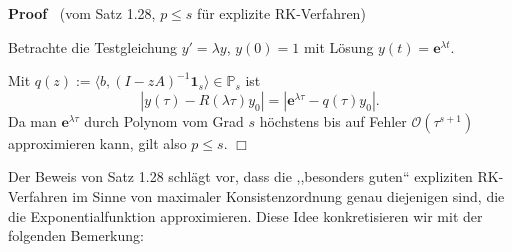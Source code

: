 \documentclass{book}
\newcommand{\assign}{:=}
\newcommand{\tmmathbf}[1]{\ensuremath{\boldsymbol{#1}}}
\newenvironment{proof}{\noindent\textbf{Proof\ }}{\hspace*{\fill}$\Box$\medskip}
\begin{document}
\begin{proof}
  (vom Satz 1.28, $p \leq s$ f{\"u}r explizite RK-Verfahren)
  
  Betrachte die Testgleichung $y' = \lambda y$, $y (0) = 1$ mit L{\"o}sung $y
  (t) =\mathbf{e}^{\lambda t}$.
  
  Mit $q (z) \assign \langle b, (I - z A)^{- 1} \tmmathbf{1}_s \rangle \in
  \mathbb{P}_s$ ist
  \[ | y (\tau) - R (\lambda \tau) y_0 | = | \mathbf{e}^{\lambda \tau} - q
     (\tau) y_0  | . \]
  {\hspace{1.7em}}Da man $\mathbf{e}^{\lambda \tau}$ durch Polynom vom Grad
  $s$ h{\"o}chstens bis auf Fehler $\mathcal{O} (\tau^{s + 1})$ approximieren
  kann, gilt also $p \leq s$. 
\end{proof}

Der Beweis von Satz 1.28 schl{\"a}gt vor, dass die ,,besonders guten``
expliziten RK-Verfahren im Sinne von maximaler Konsistenzordnung genau
diejenigen sind, die die Exponentialfunktion approximieren. Diese Idee
konkretisieren wir mit der folgenden Bemerkung:
\end{document}
